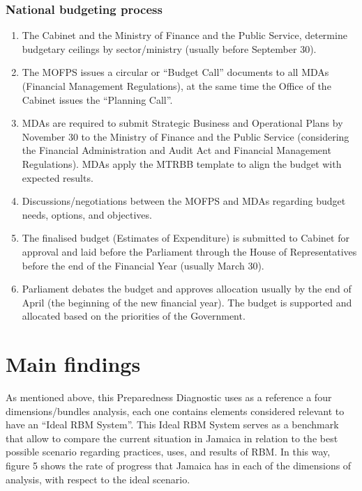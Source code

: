 \documentclass[
  10pt,
]{book}
\begin{document}
\hypertarget{national-budgeting-process}{%
\subsection{National budgeting process}\label{national-budgeting-process}}

\begin{enumerate}
\def\labelenumi{\arabic{enumi}.}
\item
  The Cabinet and the Ministry of Finance and the Public Service, determine budgetary ceilings by sector/ministry (usually before September 30).
\item
  The MOFPS issues a circular or ``Budget Call'' documents to all MDAs (Financial Management Regulations), at the same time the Office of the Cabinet issues the ``Planning Call''.
\item
  MDAs are required to submit Strategic Business and Operational Plans by November 30 to the Ministry of Finance and the Public Service (considering the Financial Administration and Audit Act and Financial Management Regulations). MDAs apply the MTRBB template to align the budget with expected results.
\item
  Discussions/negotiations between the MOFPS and MDAs regarding budget needs, options, and objectives.
\item
  The finalised budget (Estimates of Expenditure) is submitted to Cabinet for approval and laid before the Parliament through the House of Representatives before the end of the Financial Year (usually March 30).
\item
  Parliament debates the budget and approves allocation usually by the end of April (the beginning of the new financial year). The budget is supported and allocated based on the priorities of the Government.
\end{enumerate}

\hypertarget{section5}{%
\chapter{Main findings}\label{section5}}

As mentioned above, this Preparedness Diagnostic uses as a reference a four dimensions/bundles analysis, each one contains elements considered relevant to have an ``Ideal RBM System''. This Ideal RBM System serves as a benchmark that allow to compare the current situation in Jamaica in relation to the best possible scenario regarding practices, uses, and results of RBM. In this way, figure 5 shows the rate of progress that Jamaica has in each of the dimensions of analysis, with respect to the ideal scenario.
\end{document}
